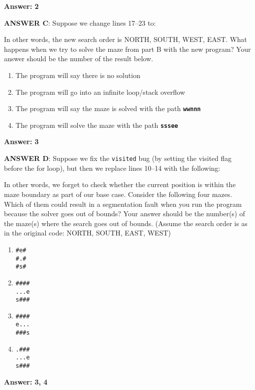 \ifexam

\else

{\bf Answer: 2}

\fi

{\bf ANSWER C}: Suppose we change lines 17--23 to:

\resetlinenumber[17]
\linenumbers
\begin{tt}
	
\end{tt}
\nolinenumbers

In other words, the new search order is NORTH, SOUTH, WEST, EAST. What happens when we try to solve the maze from part B with the new program? Your answer should be the number of the result below.

\begin{enumerate}
\item The program will say there is no solution
\item The program will go into an infinite loop/stack overflow
\item The program will say the maze is solved with the path {\tt\bf wwnnn}
\item The program will solve the maze with the path {\tt\bf sssee}	
\end{enumerate}

\ifexam

\else

{\bf Answer: 3}

\fi

{\bf ANSWER D}: Suppose we fix the {\tt visited} bug (by setting the visited flag before the for loop), but then we replace lines 10--14 with the following:

\resetlinenumber[10]
\linenumbers
\begin{tt}
	
\end{tt}
\nolinenumbers

In other words, we forget to check whether the current position is within the maze boundary as part of our base case. Consider the following four mazes. Which of them could result in a segmentation fault when you run the program because the solver goes out of bounds? Your answer should be the number(s) of the maze(s) where the search goes out of bounds. (Assume the search order is as in the original code: NORTH, SOUTH, EAST, WEST)

\begin{enumerate}
\item 	
\begin{verbatim}
#e#
#.#
#s#
\end{verbatim}

\item
\begin{verbatim}
####
...e
s###	
\end{verbatim}

\item
\begin{verbatim}
####
e...
###s	
\end{verbatim}

\item
\begin{verbatim}
.###
...e
s###	
\end{verbatim}

\end{enumerate}

\ifexam

\else

{\bf Answer: 3, 4}

\fi